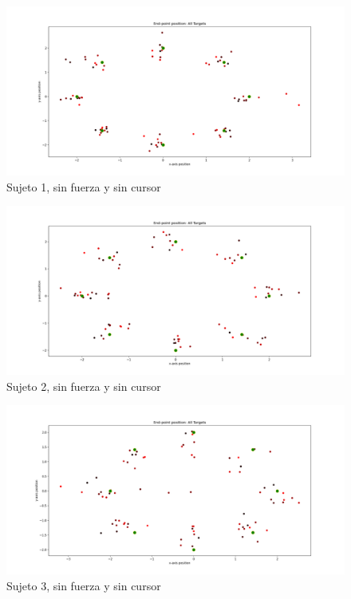 \documentclass[a4paper,11pt, oneside]{book}
\begin{document}
\begin{figure}[H]
	\includegraphics[width=\linewidth]{sujeto1/no_force_no_cursor/trayectorias_puntos}
	\caption{Sujeto 1, sin  fuerza y sin cursor}
	\label{1-3-2}
\end{figure}
\begin{figure}[H]
	\includegraphics[width=\linewidth]{sujeto2/no_force_no_cursor/trayectorias_puntos}
	\caption{Sujeto 2, sin  fuerza y sin cursor}
	\label{2-3-2}
\end{figure}
\begin{figure}[H]
	\includegraphics[width=\linewidth]{sujeto3/no_force_no_cursor/trayectorias_puntos}
	\caption{Sujeto 3, sin  fuerza y sin cursor}
	\label{3-3-2}
\end{figure}
\end{document}
